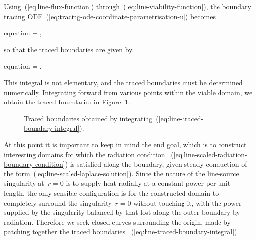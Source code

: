 Using~(\ref{eq:line-flux-function})
through~(\ref{eq:line-viability-function}),
the boundary tracing ODE~(\ref{eq:tracing-ode-coordinate-parametrisation-u})
becomes
\begin{important}{equation}
   = \mp {},
  \label{eq:line-tracing-ode-coordinate-parametrisation-r}
\end{important}
so that the traced boundaries are given by
\begin{important}{equation}
  \phi = \mp \int {}.
  \label{eq:line-traced-boundary-integral}
\end{important}
This integral is not elementary,
and the traced boundaries must be determined numerically.
Integrating forward from various points within the viable domain,
we obtain the traced boundaries in Figure~\ref{fig:line-traced-boundaries}.

\begin{figure}
  \newcommand*{\subfigurewidth}{0.325\textwidth}
  \centering
  \begin{subfigure}{\subfigurewidth}
  \end{subfigure}
  \hfill
  \begin{subfigure}{\subfigurewidth}
  \end{subfigure}
  \hfill
  \begin{subfigure}{\subfigurewidth}
  \end{subfigure}
  \caption{
    Traced boundaries
    obtained by integrating~(\ref{eq:line-traced-boundary-integral}).
  }
  \label{fig:line-traced-boundaries}
\end{figure}

At this point it is important to keep in mind the end goal,
which is to construct interesting domains
for which the radiation condition~%
  (\ref{eq:line-scaled-radiation-boundary-condition})
is satisfied along the boundary,
given steady conduction of the form~(\ref{eq:line-scaled-laplace-solution}).
Since the nature of the line-source singularity at~$r = 0$
is to supply heat radially at a constant power per unit length,
the only sensible configuration is for the constructed domain to
completely surround the singularity~$r = 0$ without touching it,
with the power supplied by the singularity balanced
by that lost along the outer boundary by radiation.
Therefore we seek closed curves surrounding the origin,
made by patching together the traced boundaries~%
  (\ref{eq:line-traced-boundary-integral}).

